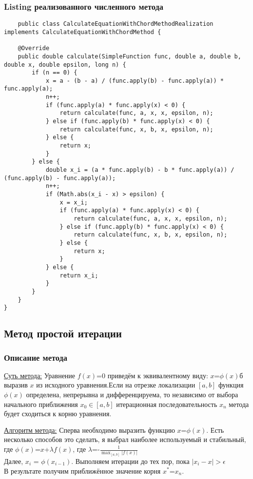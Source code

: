 \subsubsection{Listing реализованного численного метода}
\tiny
\begin{verbatim}
    public class CalculateEquationWithChordMethodRealization implements CalculateEquationWithChordMethod {
    
    @Override
    public double calculate(SimpleFunction func, double a, double b, double x, double epsilon, long n) {
        if (n == 0) {
            x = a - (b - a) / (func.apply(b) - func.apply(a)) * func.apply(a);
            n++;
            if (func.apply(a) * func.apply(x) < 0) {
                return calculate(func, a, x, x, epsilon, n);
            } else if (func.apply(b) * func.apply(x) < 0) {
                return calculate(func, x, b, x, epsilon, n);
            } else {
                return x;
            }
        } else {
            double x_i = (a * func.apply(b) - b * func.apply(a)) / (func.apply(b) - func.apply(a));
            n++;
            if (Math.abs(x_i - x) > epsilon) {
                x = x_i;
                if (func.apply(a) * func.apply(x) < 0) {
                    return calculate(func, a, x, x, epsilon, n);
                } else if (func.apply(b) * func.apply(x) < 0) {
                    return calculate(func, x, b, x, epsilon, n);
                } else {
                    return x;
                }
            } else {
                return x_i;
            }
        }
    }
}
\end{verbatim}
\normalsize

\subsection{Метод простой итерации}

\subsubsection{Описание метода}
\underline{Суть метода:} Уравнение $f(x)$=0 приведём к эквивалентному виду: $x$=$\phi(x)$б выразив $x$ из исходного
уравнения.Если на отрезке локализации $[a,b]$ функция $\phi(x)$ определена, непрерывна и дифференцируема, то независимо
от выбора начального приближения $x_0$$\in$$[a,b]$ итерационная последовательность ${x_n}$ метода будет сходиться к корню
уравнения.


\underline{Алгоритм метода:} Сперва необходимо выразить функцию $x$=$\phi(x)$. Есть несколько способов это сделать, я выбрал
наиболее используемый и стабильный, где $\phi(x)$=$x$+$\lambda f(x)$, где $\lambda$=-$\frac{1}{\max_{[a,b]}|f(x)|}$\\
Далее, $x_i$ = $\phi(x_{i-1})$. Выполняем итерации до тех пор, пока $|x_i - x| > \epsilon$\\
В результате получим приближённое значение корня $x^*$=$x_n$.

